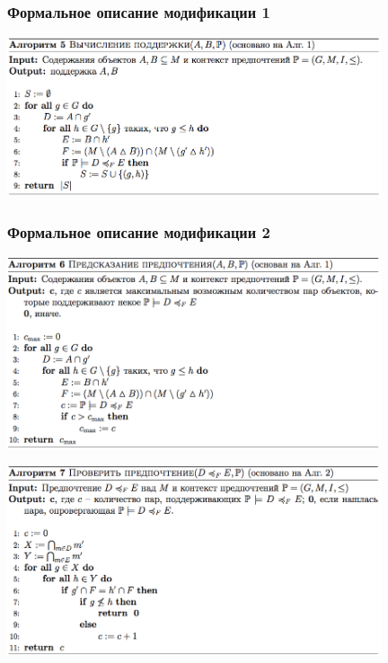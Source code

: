 \documentclass[xcolor=table]{beamer}
\theoremstyle{definition}
\begin{document}
	\begin{frame}[allowframebreaks]
		\frametitle{Формальное описание модификации 1}
		\begin{center}
			\includegraphics[width=110mm]{./images/algo5.png}
		\end{center}
	\end{frame}
	
	\begin{frame}[allowframebreaks]
		\frametitle{Формальное описание модификации 2}
		\begin{center}
			\includegraphics[width=110mm]{./images/algo6.png}
		\end{center}
		\begin{center}
			\includegraphics[width=110mm]{./images/algo7.png}
		\end{center}
	\end{frame}
	
\end{document}
